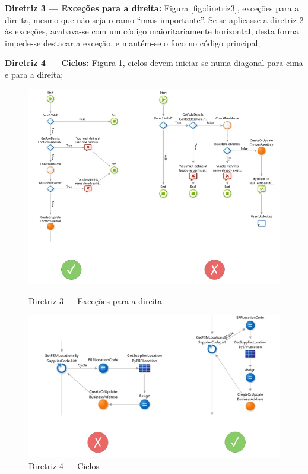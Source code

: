     \textbf{Diretriz 3 — Exceções para a direita:} Figura \ref{fig:diretriz3}, exceções para a direita, mesmo que não seja o ramo ``mais importante''. Se se aplicasse a diretriz 2 às exceções, acabava-se com um código maioritariamente horizontal, desta forma impede-se destacar a exceção, e mantém-se o foco no código principal;

    \textbf{Diretriz 4 — Ciclos:} Figura \ref{fig:diretriz4}, ciclos devem iniciar-se numa diagonal para cima e para a direita;

    \begin{figure}[htbp]
        \centering
        \begin{minipage}{.5\textwidth}
            \centering
            \includegraphics[scale=0.40]{imgs/diretrizes/3.png}
            \caption{Diretriz 3 — Exceções para a direita}\label{fig:diretriz3}
        \end{minipage}%
        \begin{minipage}{.5\textwidth}
            \centering
            \includegraphics[scale=0.32]{imgs/diretrizes/4.png}
            \caption{Diretriz 4 — Ciclos}\label{fig:diretriz4}
        \end{minipage}
    \end{figure}

